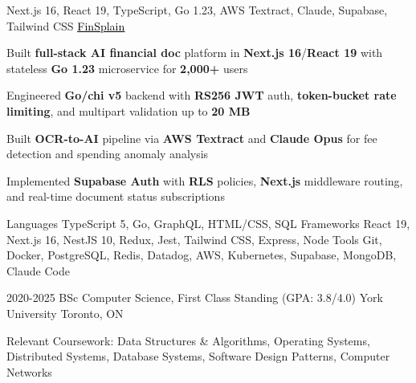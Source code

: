 \documentclass[11pt, a4paper]{awesome-cv}
\begin{document}

\begin{cventries}
  \cventry
  {Next.js 16, React 19, TypeScript, Go 1.23, AWS Textract, Claude, Supabase, Tailwind CSS}
  {\href{https://finsplain.net}{\textcolor{black}{\underline{FinSplain}} \faExternalLink}}
  {}
  {}
  {
    \begin{cvitems}
      \item {Built \textbf{full-stack AI financial doc} platform in \textbf{Next.js 16}/\textbf{React 19} with stateless \textbf{Go 1.23} microservice for \textbf{2,000+} users}
      \item {Engineered \textbf{Go/chi v5} backend with \textbf{RS256 JWT} auth, \textbf{token-bucket rate limiting}, and multipart validation up to \textbf{20 MB}}
      \item {Built \textbf{OCR-to-AI} pipeline via \textbf{AWS Textract} and \textbf{Claude Opus} for fee detection and spending anomaly analysis}
      \item {Implemented \textbf{Supabase Auth} with \textbf{RLS} policies, \textbf{Next.js} middleware routing, and real-time document status subscriptions}
    \end{cvitems}
  }
\end{cventries}


\begin{cvskills}
  \cvskill
  {Languages}
  {TypeScript 5, Go, GraphQL, HTML/CSS, SQL}
  \cvskill
  {Frameworks}
  {React 19, Next.js 16, NestJS 10, Redux, Jest, Tailwind CSS, Express, Node}
  \cvskill
  {Tools}
  {Git, Docker, PostgreSQL, Redis, Datadog, AWS, Kubernetes, Supabase, MongoDB, Claude Code}
\end{cvskills}

\vspace{-2mm}

\begin{cventries}
  \cventry
  {2020-2025}
  {BSc Computer Science, First Class Standing (GPA: 3.8/4.0)}
  {York University}
  {Toronto, ON}
  {%
    \begin{cvitems}
      \item {Relevant Coursework: Data Structures \& Algorithms, Operating Systems, Distributed Systems, Database Systems, Software Design Patterns, Computer Networks}
    \end{cvitems}
    \vspace{-4mm}
  }
\end{cventries}
\end{document}
